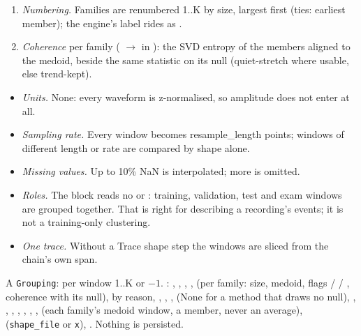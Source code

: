 \begin{enumerate}
\begin{itemize}
  \item \texttt{ward}: Ward linkage \citep{ward1963hierarchical} on the normalised scale-invariant
    distance, cut at the distance ward\_cut (0.42); a window whose nearest family medoid is
    further than ward\_omit\_d (0.5) is . No noise test. Refused past 5000 waveforms
    (), since it builds a square matrix.
  \end{itemize}
  The engine then omits every group under min\_group members () for every
  method, and names each family's medoid.
\item \emph{Numbering.} Families are renumbered 1..K by size, largest first (ties: earliest
  member); the engine's label rides as .
\item \emph{Coherence} per family ( $\to$  in
  ): the SVD entropy of the members aligned to the medoid,
  beside the same statistic on its null (quiet-stretch where usable, else trend-kept).
\end{enumerate}

\begin{itemize}
\item \emph{Units.} None: every waveform is z-normalised, so amplitude does not enter at all.
\item \emph{Sampling rate.} Every window becomes resample\_length points; windows of different
  length or rate are compared by shape alone.
\item \emph{Missing values.} Up to 10\% NaN is interpolated; more is omitted.
\item \emph{Roles.} The block reads no  or : training, validation, test
  and exam windows are grouped together. That is right for describing a recording's events; it is
  not a training-only clustering.
\item \emph{One trace.} Without a Trace shape step the windows are sliced from the chain's own
  span.
\end{itemize}

A \texttt{Grouping}: per window 1..K or $-1$. : , ,
, ,  (per family: size, medoid, flags
 /  / , coherence with its null),  by reason,
, , ,  (None for a
method that draws no null), , , ,
, , , ,  (each family's
medoid window, a member, never an average),  (\texttt{shape\_file} or
\texttt{x}), . Nothing is persisted.

